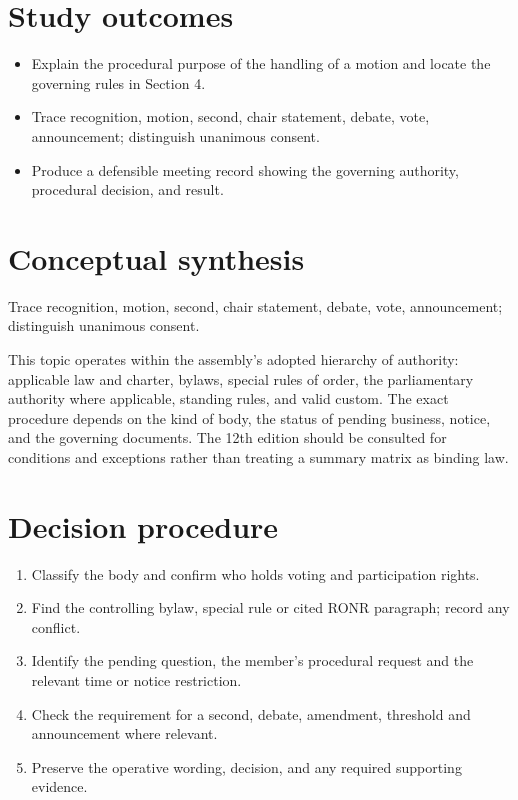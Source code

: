 \documentclass[11pt]{article}
\begin{document}
\SuiteOpen
{}
\section{Study outcomes}
\begin{itemize}[leftmargin=*,itemsep=4pt]
\item Explain the procedural purpose of the handling of a motion and locate the governing rules in Section 4.
\item Trace recognition, motion, second, chair statement, debate, vote, announcement; distinguish unanimous consent.
\item Produce a defensible meeting record showing the governing authority, procedural decision, and result.
\end{itemize}

\section{Conceptual synthesis}
Trace recognition, motion, second, chair statement, debate, vote, announcement; distinguish unanimous consent.

This topic operates within the assembly’s adopted hierarchy of authority: applicable law and charter, bylaws, special rules of order, the parliamentary authority where applicable, standing rules, and valid custom. The exact procedure depends on the kind of body, the status of pending business, notice, and the governing documents. The 12th edition should be consulted for conditions and exceptions rather than treating a summary matrix as binding law.
\section{Decision procedure}
\begin{enumerate}[leftmargin=*,itemsep=4pt]
\item Classify the body and confirm who holds voting and participation rights.
\item Find the controlling bylaw, special rule or cited RONR paragraph; record any conflict.
\item Identify the pending question, the member’s procedural request and the relevant time or notice restriction.
\item Check the requirement for a second, debate, amendment, threshold and announcement where relevant.
\item Preserve the operative wording, decision, and any required supporting evidence.
\end{enumerate}
\end{document}
